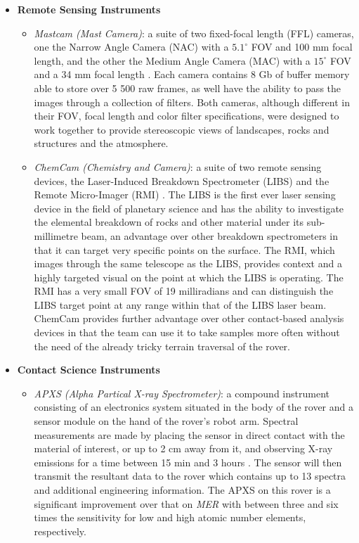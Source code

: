         \begin{itemize}
          \item \textbf{Remote Sensing Instruments}
          \begin{itemize}
            \item \textit{Mastcam (Mast Camera)}: a suite of two fixed-focal length (FFL) cameras, one the Narrow Angle Camera (NAC) with a $5.1^{\circ}$ FOV and 100 mm focal length, and the other the Medium Angle Camera (MAC) with a $15^{\circ}$ FOV and a 34 mm focal length \cite{mslsciencecornermastcam}. Each camera contains 8 Gb of buffer memory able to store over 5 500 raw frames, as well have the ability to pass the images through a collection of filters. Both cameras, although different in their FOV, focal length and color filter specifications, were designed to work together to provide stereoscopic views of landscapes, rocks and structures and the atmosphere.
            \item \textit{ChemCam (Chemistry and Camera)}: a suite of two remote sensing devices, the Laser-Induced Breakdown Spectrometer (LIBS) and the Remote Micro-Imager (RMI) \cite{mslsciencecornerchemcam}. The LIBS is the first ever laser sensing device in the field of planetary science and has the ability to investigate the elemental breakdown of rocks and other material under its sub-millimetre beam, an advantage over other breakdown spectrometers in that it can target very specific points on the surface. The RMI, which images through the same telescope as the LIBS, provides context and a highly targeted visual on the point at which the LIBS is operating. The RMI has a very small FOV of 19 milliradians and can distinguish the LIBS target point at any range within that of the LIBS laser beam. ChemCam provides further advantage over other contact-based analysis devices in that the team can use it to take samples more often without the need of the already tricky terrain traversal of the rover.
          \end{itemize}
          \item \textbf{Contact Science Instruments}
          \begin{itemize}
            \item \textit{APXS (Alpha Partical X-ray Spectrometer)}: a compound instrument consisting of an electronics system situated in the body of the rover and a sensor module on the hand of the rover's robot arm. Spectral measurements are made by placing the sensor in direct contact with the material of interest, or up to 2 cm away from it, and observing X-ray emissions for a time between 15 min and 3 hours \cite{mslsciencecornerapxs}. The sensor will then transmit the resultant data to the rover which contains up to 13 spectra and additional engineering information. The APXS on this rover is a significant improvement over that on \textit{MER} with between three and six times the sensitivity for low and high atomic number elements, respectively.

\end{itemize}
\end{itemize}
